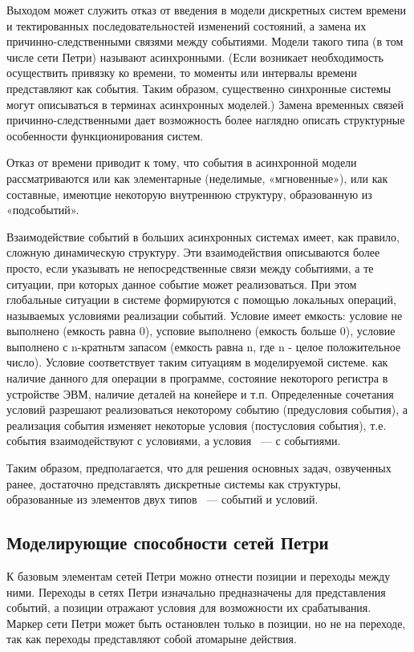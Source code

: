 Выходом может служить отказ от введения в модели дискретных систем времени и тектированных последовательностей изменений состояний, а замена их причинно-следственными связями между событиями. Модели такого типа (в том числе сети Петри) называют асинхронными. (Если возникает необходимость осуществить привязку ко времени, то моменты или интервалы времени представляют как события. Таким образом, существенно синхронные системы могут описываться в терминах асинхронных моделей.) Замена временных связей причинно-следственными дает возможность более наглядно описать структурные особенности функционирования систем.

Отказ от времени приводит к тому, что события в асинхронной модели рассматриваются или как элементарные (неделимые, «мгновенные»)‚ или как составные, имеютцие некоторую внутреннюю структуру, образованную
из «подсобытий».

Взаимодействие событий в больших асинхронных системах имеет, как правило, сложную динамическую структуру. Эти взаимодействия описываются более просто, если указывать не непосредственные связи между событиями, а те ситуации, при которых данное событие может реализоваться. При этом глобальные ситуации в системе формируются с помощью локальных операций, называемых условиями реализации событий. Условие имеет емкость: условие не выполнено (емкость равна 0), усповие выполнено (емкость больше 0), условие выполнено с n-кратньтм запасом
(емкость равна n, где n - целое положительное число). Условие соответствует таким ситуациям в моделируемой системе. как наличие данного для операции в программе, состояние некоторого регистра в устройстве ЭВМ, наличие деталей на конейере и т.п. Определенные сочетания условий разрешают реализоваться некоторому событию (предусловия события), а реализация события изменяет некоторые условия (постусловия события), т.е. события взаимодействуют с условиями, а условия ~--- с событиями.

Таким образом, предполагается, что для решения основных задач, озвученных ранее, достаточно представлять дискретные системы как структуры, образованные из элементов двух типов ~--- событий и условий.

\subsection{Моделирующие способности сетей Петри}

К базовым элементам сетей Петри можно отнести позиции и переходы между ними. Переходы в сетях Петри изначально предназначены для представления событий, а позиции отражают условия для возможности их срабатывания. Маркер сети Петри может быть остановлен только в позиции, но не на переходе, так как переходы представляют собой атомарыне действия.

